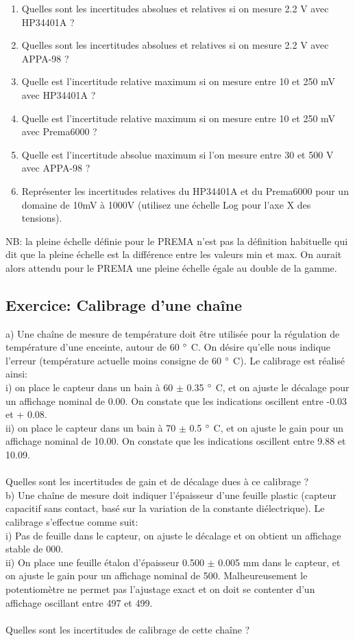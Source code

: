 \begin{enumerate}
    \item Quelles sont les incertitudes absolues et relatives si on mesure 2.2 V avec HP34401A ?
    \item Quelles sont les incertitudes absolues et relatives si on mesure 2.2 V avec APPA-98 ?
    \item Quelle est l'incertitude relative maximum si on mesure entre 10 et 250 mV avec HP34401A ?
    \item Quelle est l'incertitude relative maximum si on mesure entre 10 et 250 mV avec Prema6000 ?
    \item Quelle est l'incertitude absolue maximum si l'on mesure entre 30 et 500 V avec APPA-98 ?
    \item Représenter les incertitudes relatives du HP34401A et du Prema6000 pour un domaine de 10mV à 1000V (utilisez une échelle Log pour l'axe X des tensions).
\end{enumerate}
NB: la pleine échelle définie pour le PREMA n'est pas la définition habituelle qui dit que la pleine échelle est la différence entre les valeurs min et max. On aurait alors attendu pour le PREMA une pleine échelle égale au double de la gamme.

\subsection{Exercice: Calibrage d'une chaîne}
a)	Une chaîne de mesure de température doit être utilisée pour la régulation de température d'une enceinte, autour de 60 $\degree$ C. On désire qu'elle nous indique l'erreur (température actuelle moins consigne de 60 $\degree$ C). Le calibrage est réalisé ainsi: \\
i)	on place le capteur dans un bain à 60 $\pm$ 0.35 $\degree$ C, et on ajuste le décalage pour un affichage nominal de 0.00. On constate que les indications oscillent entre -0.03 et + 0.08. \\
ii)	on place le capteur dans un bain à 70 $\pm$ 0.5 $\degree$ C, et on ajuste le gain pour un affichage nominal de 10.00. On constate que les indications oscillent entre 9.88 et 10.09. \\  ~ \\
Quelles sont les incertitudes de gain et de décalage dues à ce calibrage ? \\

b)	Une chaîne de mesure doit indiquer l'épaisseur d'une feuille plastic (capteur capacitif sans contact, basé sur la variation de la constante diélectrique). Le calibrage s'effectue comme suit: \\
i)	Pas de feuille dans le capteur, on ajuste le décalage et on obtient un affichage stable de 000. \\
ii)	On place une feuille étalon d'épaisseur 0.500  $\pm$  0.005 mm dans le capteur, et on ajuste le gain pour un affichage nominal de 500. Malheureusement le potentiomètre ne permet pas l'ajustage exact et on doit se contenter d'un affichage oscillant entre 497 et 499. \\~ \\
Quelles sont les incertitudes de calibrage de cette chaîne ? \\

